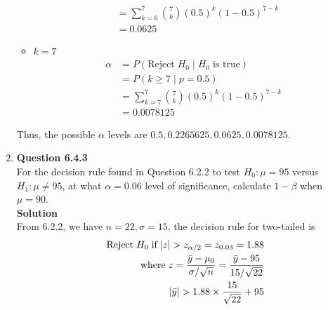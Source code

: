 \documentclass{uofa-eng-assignment}
\begin{document}
\begin{enumerate}
\begin{itemize}
\begin{align*}
                             & = \sum_{k=6}^{7} \binom{7}{k} (0.5)^k (1 - 0.5)^{7-k} \\
                             & = 0.0625
                  \end{align*}
            \item $k = 7$
                  \begin{align*}
                      \alpha & = P(\text{Reject}\;H_0\;|\;H_0\;\text{is true})       \\
                             & = P(k \geq 7\;|\;p= 0.5)                              \\
                             & = \sum_{k=7}^{7} \binom{7}{k} (0.5)^k (1 - 0.5)^{7-k} \\
                             & = 0.0078125
                  \end{align*}
        \end{itemize}
        Thus, the possible $\alpha$ levels are $\boldsymbol{0.5, 0.2265625, 0.0625, 0.0078125}$.
    \item[]
        \textbf{Question 6.4.3} \\
        For the decision rule found in Question 6.2.2 to test $H_0\!:\mu = 95$ versus $H_1\!:\mu \neq 95$,
        at what $\alpha = 0.06$ level of significance, calculate $1 - \beta$ when $\mu = 90$. \\
        \textbf{Solution} \\
        From 6.2.2, we have $n = 22, \sigma = 15$, the decision rule for two-tailed is
        \begin{align*}
            \text{Reject}\;H_0\;\text{if}\;|z| > z_{\alpha/2} = z_{0.03} = 1.88                               \\
            \text{where}\;z = \frac{\bar{y} - \mu_0}{\sigma / \sqrt{n}} = \frac{\bar{y} - 95}{15 / \sqrt{22}} \\
            \absolutevalue{\bar{y} } > 1.88 \times \frac{15}{\sqrt{22}} + 95                                  \\

\end{align*}
\end{enumerate}
\end{document}
